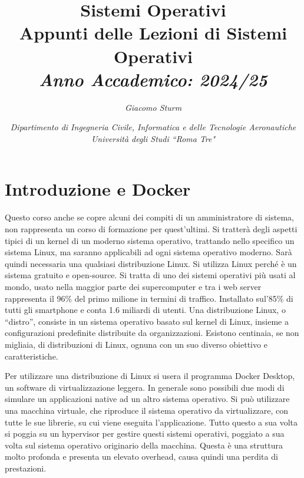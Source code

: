 \documentclass{article}
\numberwithin{equation}{subsection}
\begin{document}
    

\title{%
    \textbf{Sistemi Operativi}  \\ 
    \large Appunti delle Lezioni di Sistemi Operativi \\
    \textit{Anno Accademico: 2024/25}}
\author{\textit{Giacomo Sturm}}
\date{\textit{Dipartimento di Ingegneria Civile, Informatica e delle Tecnologie Aeronautiche \\
Università degli Studi ``Roma Tre"}}

\maketitle
\thispagestyle{link}

\clearpage


\pagestyle{fancy}
\fancyhead{}\fancyfoot{}
\fancyfoot[C]{\thepage}

\tableofcontents

\clearpage
{}


\section{Introduzione e Docker} 

Questo corso anche se copre alcuni dei compiti di un amministratore di sistema, non rappresenta un corso di formazione per quest'ultimi. Si tratterà degli aspetti tipici di un kernel di un 
moderno sistema operativo, trattando nello specifico un sistema Linux, ma saranno applicabili ad ogni sistema operativo moderno. Sarà quindi necessaria una qualsiasi distribuzione Linux. Si utilizza Linux perché 
è un sistema gratuito e open-source. Si tratta di uno dei sistemi operativi più usati al mondo, usato nella maggior parte dei supercomputer e tra i web server rappresenta il 96\% del primo milione in termini di 
traffico. Installato sul'85\% di tutti gli smartphone e conta 1.6 miliardi di utenti. 
Una distribuzione Linux, o ``distro'', consiste in un sistema operativo basato sul kernel di Linux, insieme a configurazioni predefinite distribuite da organizzazioni. Esistono centinaia, se non migliaia, 
di distribuzioni di Linux, ognuna con un suo diverso obiettivo e caratteristiche. 

Per utilizzare una distribuzione di Linux si usera il programma Docker Desktop, un software di virtualizzazione leggera. In generale sono possibili due modi di simulare un applicazioni native ad un altro sistema 
operativo. Si può utilizzare una macchina virtuale, che riproduce il sistema operativo da virtualizzare, con tutte le sue librerie, su cui viene eseguita l'applicazione. Tutto questo a sua volta si poggia su un 
hypervisor per gestire questi sistemi operativi, poggiato a sua volta sul sistema operativo originario della macchina. Questa è una struttura molto profonda e presenta un elevato overhead, causa quindi una perdita 
di prestazioni. 
\end{document}
